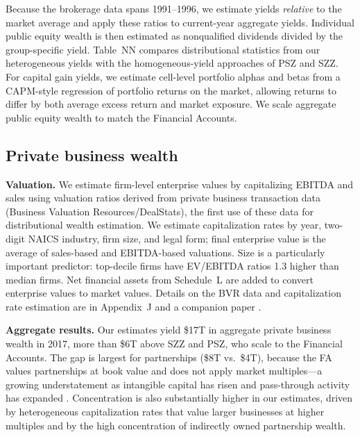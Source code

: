Because the brokerage data spans 1991--1996, we estimate yields \textit{relative} to the market average and apply these ratios to current-year aggregate yields. Individual public equity wealth is then estimated as nonqualified dividends divided by the group-specific yield. Table~NN compares distributional statistics from our heterogeneous yields with the homogeneous-yield approaches of PSZ and SZZ. For capital gain yields, we estimate cell-level portfolio alphas and betas from a CAPM-style regression of portfolio returns on the market, allowing returns to differ by both average excess return and market exposure. We scale aggregate public equity wealth to match the Financial Accounts.

\subsection{Private business wealth}

\textbf{Valuation.} We estimate firm-level enterprise values by capitalizing EBITDA and sales using valuation ratios derived from private business transaction data (Business Valuation Resources/DealStats), the first use of these data for distributional wealth estimation. We estimate capitalization rates by year, two-digit NAICS industry, firm size, and legal form; final enterprise value is the average of sales-based and EBITDA-based valuations. Size is a particularly important predictor: top-decile firms have EV/EBITDA ratios 1.3 higher than median firms. Net financial assets from Schedule~L are added to convert enterprise values to market values. Details on the BVR data and capitalization rate estimation are in Appendix~J and a companion paper \citep{campbell2025value}.

\textbf{Aggregate results.} Our estimates yield \$17T in aggregate private business wealth in 2017, more than \$6T above SZZ and PSZ, who scale to the Financial Accounts. The gap is largest for partnerships (\$8T vs.\ \$4T), because the FA values partnerships at book value and does not apply market multiples---a growing understatement as intangible capital has risen \citep{bhandari2021sweat,corrado2009intangible} and pass-through activity has expanded \citep{smith2019capitalists,smith2022rise}. Concentration is also substantially higher in our estimates, driven by heterogeneous capitalization rates that value larger businesses at higher multiples and by the high concentration of indirectly owned partnership wealth.

